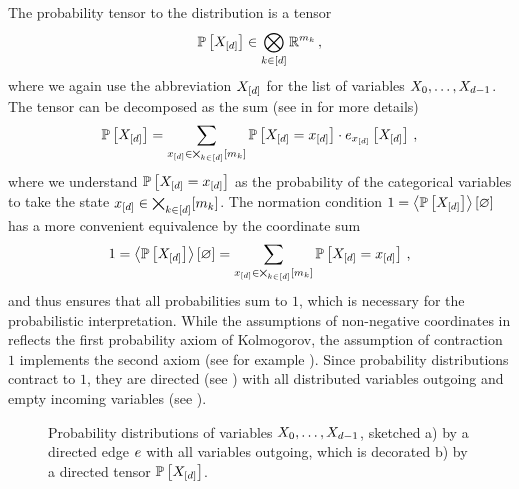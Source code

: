 The probability tensor to the distribution is a tensor
\begin{align*}
    \mathbb{P}\left[X_{[d]}\right]\in\bigotimes_{k\in[d]}\mathbb{R}^{m_{k}} \, ,
\end{align*}
where we again use the abbreviation $X_{[d]}$ for the list of variables $X_{0},\ldots,X_{d-1}$.
The tensor can be decomposed as the sum (see  in  for more details)
\begin{align*}
    \mathbb{P}\left[X_{[d]}\right] = \sum_{x_{[d]}\in\bigtimes_{k\in[d]}[m_{k}]} \mathbb{P}\left[X_{[d]}=x_{[d]}\right] \cdot e_{x_{[d]}}\left[X_{[d]}\right] \, ,
\end{align*}
where we understand $\mathbb{P}\left[X_{[d]}=x_{[d]}\right]$ as the probability of the categorical variables to take the state $x_{[d]}\in\bigtimes_{k\in[d]}[m_{k}]$.
The normation condition $1=\left\langle \mathbb{P}\left[X_{[d]}\right]\right\rangle \left[ \varnothing \right]$ has a more convenient equivalence by the coordinate sum
\begin{align*}
    1 = \left\langle \mathbb{P}\left[X_{[d]}\right]\right\rangle \left[ \varnothing \right]
    =  \sum_{x_{[d]}\in\bigtimes_{k\in[d]}[m_{k}]}\mathbb{P}\left[X_{[d]}=x_{[d]}\right] \, ,
\end{align*}
and thus ensures that all probabilities sum to $1$, which is necessary for the probabilistic interpretation.
While the assumptions of non-negative coordinates in  reflects the first probability axiom of Kolmogorov, the assumption of contraction $1$ implements the second axiom (see for example \cite{degroot_probability_2016}).
Since probability distributions contract to $1$, they are directed (see ) with all distributed variables outgoing and empty incoming variables (see ).

\begin{figure}[hbt!]
    \begin{center}
        
    \end{center}
    \caption{Probability distributions of variables $X_{0},\ldots,X_{d-1}$, sketched
    a) by a directed edge $e$ with all variables outgoing, which is decorated b) by a directed tensor $\mathbb{P}\left[X_{[d]}\right]$.}\label{fig:probabilityTensor}
\end{figure}



